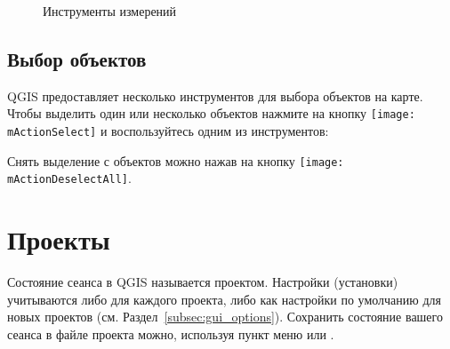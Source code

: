 \begin{figure}[ht]
\centering
     \hspace{0.33cm}
     \hspace{0.33cm}
   \caption{Инструменты измерений \wincaption} \label{fig:measure}
\end{figure}

\subsection{Выбор объектов}\label{sec:selection}

QGIS предоставляет несколько инструментов для выбора объектов на карте.
Чтобы выделить один или несколько объектов нажмите на кнопку
\texttt{[image: mActionSelect]} и воспользуйтесь одним из
инструментов:

\begin{description}
\item {}
\item {}
\item {}
\item {}
\item {}
\end{description}

Снять выделение с объектов можно нажав на кнопку \texttt{[image: mActionDeselectAll]}.

\section{Проекты}\label{sec:projects}

Состояние сеанса в QGIS называется проектом. Настройки (установки) учитываются либо
для каждого проекта, либо как настройки по умолчанию для новых проектов
(см. Раздел~\ref{subsec:gui_options}). Сохранить состояние
вашего сеанса в файле проекта можно, используя пункт меню
 \arrow {}
или  \arrow
{}.

